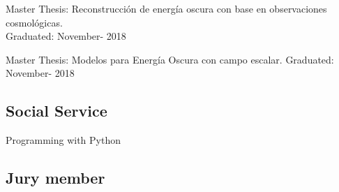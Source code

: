 \documentclass[12pt,a4paper]{moderncv}
\begin{document}
\vspace{1.0em}		
 		{Master Thesis: Reconstrucci\'on de energ\'ia oscura con base en observaciones cosmol\'ogicas.\\ 
		Graduated: November- 2018}

\vspace{0.8em}		
 		{Master Thesis: Modelos para Energ\'ia Oscura con campo escalar. 
		Graduated: November- 2018 }  
		
			
\vspace{0.8em}
\subsection{Social Service}
 		{Programming with Python}
		
			

		

\vspace{1.0em}		
\subsection{Jury member}
\vspace{0.5em}	

	
 	\vspace{1.0em}	
 
\end{document}
